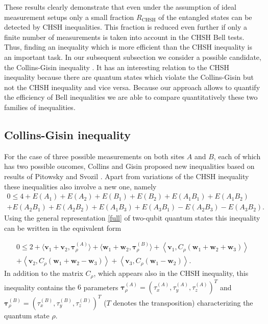 \documentclass[12pt]{iopart}
\begin{document}
These results clearly demonstrate that even under the assumption of ideal measurement setups only a small fraction 
$R_{\text{CHSH}}$ of the entangled states can be detected by CHSH inequalities. This fraction is reduced even further if only a finite number of measurements is taken into account in the CHSH Bell tests.
Thus, finding an inequality which is more efficient than the CHSH inequality is an important task. 
In our subsequent subsection we consider a possible candidate, the Collins-Gisin inequality \cite{CG}. It has an interesting relation to the 
CHSH inequality because there are quantum states which violate the Collins-Gisin but not the CHSH inequality and vice versa. 
Because our approach allows to quantify the efficiency of Bell inequalities we are able to compare quantitatively these two families of inequalities. 


\subsection{Collins-Gisin inequality}
\label{sec:CG}

For the case of three possible measurements on both sites $A$ and $B$, each of which has two possible oucomes, Collins and Gisin   \cite{CG} proposed new inequalities based on results of Pitowsky and Svozil \cite{PSvozil}. 
Apart from 
variations of the CHSH inequality these inequalities also involve a new one, namely
\begin{eqnarray} \label{CG}
 0\leqslant 4 +  E(A_1) + E(A_2) + E(B_1)+ E(B_2)+  E(A_1B_1)+ E(A_1B_2)  \\
+E(A_2B_1)+ E(A_2B_2)+ E(A_1B_3)+ E(A_3B_1)-E(A_2B_3)-E(A_3B_2). \nonumber
\end{eqnarray}
Using the general representation \eqref{full} of two-qubit quantum states this inequality can be written in the equivalent form

\begin{eqnarray}\label{CGrew}
 0\leqslant 2+  \langle \bm{v}_1 +\bm{v}_2, \bm{\tau}^{(A)}_{\rho} \rangle +  \langle \bm{w}_1 +\bm{w}_2, \bm{\tau}^{(B)}_{\rho} \rangle + \left\langle \bm{v}_1, C_{\rho} \left(\bm{w}_1 +\bm{w}_2 +\bm{w}_3 \right) \right\rangle 
 \nonumber \\
 + \left\langle \bm{v}_2, C_{\rho} \left(\bm{w}_1 +\bm{w}_2 -\bm{w}_3 \right) \right\rangle + \left\langle \bm{v}_3, C_{\rho} \left(\bm{w}_1 -\bm{w}_2 \right) \right\rangle.
\end{eqnarray}
In addition to the matrix
$C_{\rho}$, which appears also in the CHSH inequality,  this inequality contains  the $6$ parameters  $\bm{\tau}^{(A)}_{\rho}=(\tau^{(A)}_x,\tau^{(A)}_y,\tau^{(A)}_z)^T$ and 
$\bm{\tau}^{(B)}_{\rho}=(\tau^{(B)}_x,\tau^{(B)}_y,\tau^{(B)}_z)^T$ ($T$ denotes the transposition) characterizing the quantum state $\rho$. 
\end{document}
